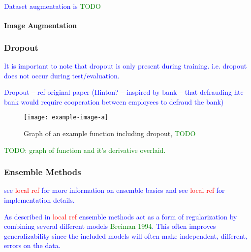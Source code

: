 \textcolor{blue}{Dataset augmentation is \textcolor{green}{TODO}}

\paragraph{Image Augmentation}



\subsubsection{Dropout}


\textcolor{blue}{It is important to note that dropout is only present during training. i.e. dropout does not occur during test/evaluation.}

\textcolor{blue}{Dropout -- ref original paper (Hinton? -- inspired by bank -- that defrauding hte bank would require cooperation between employees to defraud the bank)}


\begin{figure}[htp]
	\centering
	\texttt{[image: example-image-a]}\hfil
	\caption{Graph of an example function including dropout, \textcolor{green}{TODO}}
	\label{fig:regularization_dropout_overview}
\end{figure}
\textcolor{green}{TODO: graph of function and it's derivative overlaid.}


\subsubsection{Ensemble Methods}

\textcolor{blue}{see \textcolor{red}{local ref} for more information on ensemble basics and see \textcolor{red}{local ref} for implementation details.}

\textcolor{blue}{As described in \textcolor{red}{local ref} ensemble methods act as a form of regularization by combining several different models \textcolor{green}{Breiman 1994}. This often improves generalizability since the included models will often make independent, different, errors on the data.}

